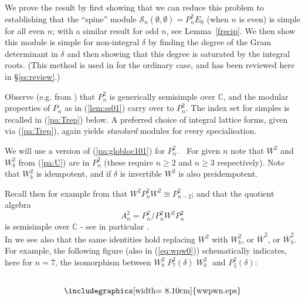 \documentclass[reqno,10pt,a4paper]{amsart}
\newcommand{\U}{\mathcal{U}}
\newcommand{\C}{\mathbb{C}}
\newcommand{\rb}[2]{\raisebox{#1}{#2}}
\newcommand{\ig}{\includegraphics}
\newcommand{\beq}{\begin{equation}}
\newcommand{\eq}{\end{equation}}
\newcommand{\blue}[1]{\textcolor{blue}{#1}}
\newcommand{\red}[1]{\textcolor{red}{#1}}
\newcommand{\ppm}[1]{\red{#1}}
\newcommand{\ppmx}[1]{}
\newcommand{\ca}[1]{\blue{#1}}
\newcommand{\caa}[1]{{#1}}
\newcommand{\spine}{\mathcal{S}_n(\emptyset,\emptyset)}
\begin{document}
We  %
prove the result 
by first showing that we can reduce this problem to establishing that
the ``spine'' module $\spine = P^2_n E_0$
(when $n$ is even)  %
is simple for all
even $n$;
with a similar result for odd $n$, see Lemma~\ref{frecip}. 
We then show this module is simple 
for non-integral $\delta$ 
by finding the degree of the Gram
determinant in $\delta$ and then showing that this degree is saturated by the
integral roots.
(This method is used in \cite{MartinSaleur94b}
for the ordinary case,
and has been reviewed here in \S\ref{ss:review}.)


\mdef   \label{pa:Pn2mod}
Observe (e.g. from \cite[Th.9.7]{amm2019tonal}) that 
$P^2_n$ is generically semisimple over $\C$, and 
the modular properties of $P_n$ as in (\ref{lem:ss01}) carry over to $P^2_n$. 
The index set for simples is  %
recalled 
in (\ref{pa:Trep})
below.
A preferred choice of integral lattice forms, given via (\ref{pa:Trep}),
again yields {\em standard} modules for every specialisation. 







\newcommand{\WW}{W^2}
\newcommand{\WWW}{W_b^2}
\newcommand{\oWW}{\overline{W}^2}
\newcommand{\oWWW}{\overline{W}_b^2}

\mdef  \label{pa:globloc2}
We will  %
use a version of (\ref{pa:globloc101}) for $P^2_n$. $\;$
For given $n$ note that $\WW$ and  $\WWW$ from (\ref{pa:U}) are in $P^2_n$ (these require $n\geq 2$ and $n\geq 3$ respectively).
Note that $\WWW$ is idempotent, and 
if $\delta$ is invertible $\WW$ is also preidempotent. 
\ppmx{[fixed now?: -this seems false at the moment! shall we define $\W$ as $\W_n$ in the cases $n>2$? ...Could define it as $\U$ in case $n=2$, and point out that this is not idempotent! - although this seems ugly!]}
Recall then for example from \cite{amm2019tonal} that 
$\WW P^2_n \WW \cong P^2_{n-2}$;
and that the quotient algebra
$$
A^2_n = P^2_n / P^2_n \WW P^2_n
$$
is semisimple over $\C$ - see in particular 
\cite[(9.3)]{amm2019tonal}. 
\\
In  \cite[(9.3)]{amm2019tonal}   %
we see also that the same identities hold replacing $\WW$ with 
$\WWW$, or $\oWW$, or $\oWWW$. 
\caa{For example, the following figure (also in 
(\ref{eq:wpw0})) 
schematically indicates,
here for $n=7$, 
the isomorphism between $W^2_b \; P^2_7(\delta) \; W^2_b \;$  and $P^2_5(\delta)$: 
}
\beq \label{eq:wpw} 
\rb{-.22in}{\ig[width= 8.10cm]{wwpwn.eps}}
\eq 
\end{document}
